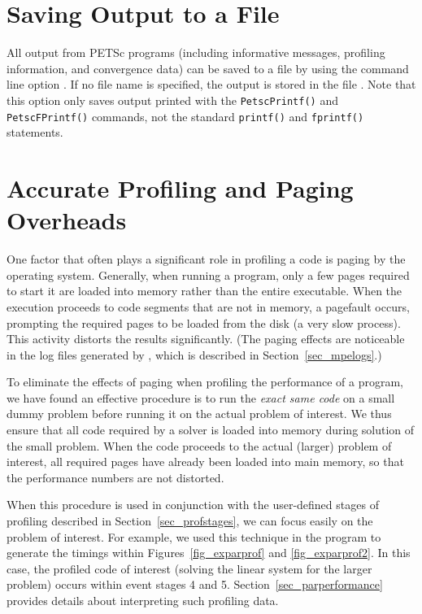 {{%
\section{Saving Output to a File}

All output from PETSc programs (including informative messages, profiling information,
and convergence data) can be saved to a file by using the command line
option . 
If no file name is specified, the output is stored in the file .
 Note that this option only saves output printed with
the \lstinline{PetscPrintf()} and \lstinline{PetscFPrintf()} commands, not the
standard \lstinline{printf()} and \lstinline{fprintf()} statements.

\section{Accurate Profiling and Paging Overheads}
\label{sec_profaccuracy}

One factor that often plays a significant role in profiling a code is
paging by the operating system.  Generally, when running a program,
only a few pages required to start it are loaded into memory rather
than the entire executable.  When the execution proceeds to code
segments that are not in memory, a pagefault occurs, prompting the
required pages to be loaded from the disk (a very slow process).  This
activity distorts the results significantly. (The paging effects are
noticeable in the log files generated by , which is
described in Section~\ref{sec_mpelogs}.)

To eliminate the effects of paging when profiling the performance of a
program, we have found an effective procedure is to run the \emph{exact same code} 
on a small dummy problem before running it on the actual problem
of interest. We thus ensure that all code required by a solver is
loaded into memory during solution of the small problem.  When the
code proceeds to the actual (larger) problem of interest, all required
pages have already been loaded into main memory, so that the
performance numbers are not distorted.

When this procedure is used in conjunction with the user-defined stages of profiling
described in Section~\ref{sec_profstages}, we can focus easily on the
problem of interest.  For example, we used this technique in the program
\href{http://www.mcs.anl.gov/petsc/petsc-current/src/ksp/ksp/examples/tutorials/ex10.c.html}{} to
generate the timings within Figures~\ref{fig_exparprof} and \ref{fig_exparprof2}.
In this case,
the profiled code of interest (solving the linear system for the larger problem)
occurs within event stages 4 and 5.  Section~\ref{sec_parperformance} provides
details about interpreting such profiling data.

}}
